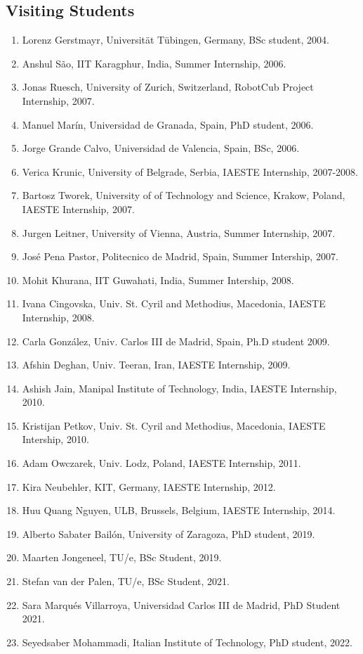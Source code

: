 \documentclass[
]{article}
\begin{document}
\subsection{Visiting Students}\label{visiting-students}

\begin{enumerate}
\def\labelenumi{\arabic{enumi}.}
\item
  Lorenz Gerstmayr, Universität Tübingen, Germany, BSc student, 2004.
\item
  Anshul São, IIT Karagphur, India, Summer Internship, 2006.
\item
  Jonas Ruesch, University of Zurich, Switzerland, RobotCub Project
  Internship, 2007.
\item
  Manuel Marín, Universidad de Granada, Spain, PhD student, 2006.
\item
  Jorge Grande Calvo, Universidad de Valencia, Spain, BSc, 2006.
\item
  Verica Krunic, University of Belgrade, Serbia, IAESTE Internship,
  2007-2008.
\item
  Bartosz Tworek, University of of Technology and Science, Krakow,
  Poland, IAESTE Internship, 2007.
\item
  Jurgen Leitner, University of Vienna, Austria, Summer Internship,
  2007.
\item
  José Pena Pastor, Politecnico de Madrid, Spain, Summer Intership,
  2007.
\item
  Mohit Khurana, IIT Guwahati, India, Summer Intership, 2008.
\item
  Ivana Cingovska, Univ. St. Cyril and Methodius, Macedonia, IAESTE
  Internship, 2008.
\item
  Carla González, Univ. Carlos III de Madrid, Spain, Ph.D student 2009.
\item
  Afshin Deghan, Univ. Teeran, Iran, IAESTE Internship, 2009.
\item
  Ashish Jain, Manipal Institute of Technology, India, IAESTE
  Internship, 2010.
\item
  Kristijan Petkov, Univ. St. Cyril and Methodius, Macedonia, IAESTE
  Intership, 2010.
\item
  Adam Owczarek, Univ. Lodz, Poland, IAESTE Internship, 2011.
\item
  Kira Neubehler, KIT, Germany, IAESTE Internship, 2012.
\item
  Huu Quang Nguyen, ULB, Brussels, Belgium, IAESTE Internship, 2014.
\item
  Alberto Sabater Bailón, University of Zaragoza, PhD student, 2019.
\item
  Maarten Jongeneel, TU/e, BSc Student, 2019.
\item
  Stefan van der Palen, TU/e, BSc Student, 2021.
\item
  Sara Marqués Villarroya, Universidad Carlos III de Madrid, PhD Student
  2021.
\item
  Seyedsaber Mohammadi, Italian Institute of Technology, PhD student,
  2022.
\end{enumerate}
\end{document}
